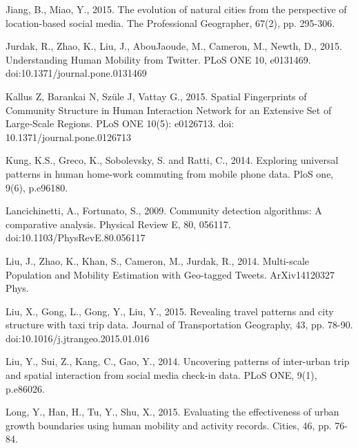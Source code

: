 \documentclass[]{tGIS2e}
\begin{document}
\begin{thebibliography}{9}
Jiang, B., Miao, Y., 2015. The evolution of natural cities from the perspective of location-based social media. The Professional Geographer, 67(2), pp. 295-306.

Jurdak, R., Zhao, K., Liu, J., AbouJaoude, M., Cameron, M., Newth, D., 2015. Understanding Human Mobility from Twitter. PLoS ONE 10, e0131469. doi:10.1371/journal.pone.0131469

Kallus Z, Barankai N, Szüle J, Vattay G., 2015. Spatial Fingerprints of Community Structure in Human Interaction Network for an Extensive Set of Large-Scale Regions. PLoS ONE 10(5): e0126713. doi: 10.1371/journal.pone.0126713 

Kung, K.S., Greco, K., Sobolevsky, S. and Ratti, C., 2014. Exploring universal patterns in human home-work commuting from mobile phone data. PloS one, 9(6), p.e96180.

Lancichinetti, A., Fortunato, S., 2009. Community detection algorithms: A comparative analysis. Physical Review E, 80, 056117. doi:10.1103/PhysRevE.80.056117

Liu, J., Zhao, K., Khan, S., Cameron, M., Jurdak, R., 2014. Multi-scale Population and Mobility Estimation with Geo-tagged Tweets. ArXiv14120327 Phys.

Liu, X., Gong, L., Gong, Y., Liu, Y., 2015. Revealing travel patterns and city structure with taxi trip data. Journal of Transportation Geography, 43, pp. 78-90. doi:10.1016/j.jtrangeo.2015.01.016

Liu, Y., Sui, Z., Kang, C., Gao, Y., 2014. Uncovering patterns of inter-urban trip and spatial interaction from social media check-in data. PLoS ONE, 9(1), p.e86026.

Long, Y., Han, H., Tu, Y., Shu, X., 2015. Evaluating the effectiveness of urban growth boundaries using human mobility and activity records. Cities, 46, pp. 76-84.


\end{thebibliography}
\end{document}
